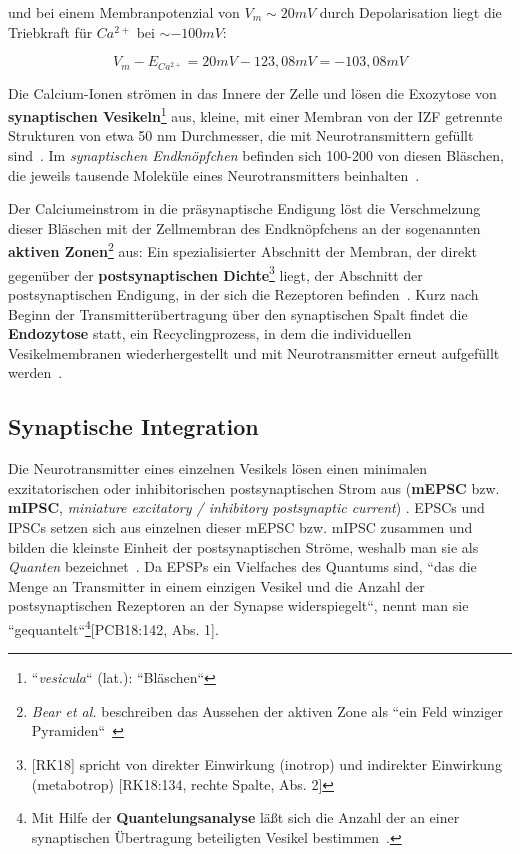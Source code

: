 {{{\pagebreak

und bei einem Membranpotenzial von $V_m \sim 20 mV$ durch Depolarisation liegt die Triebkraft für $Ca^{2+}$ bei $\sim -100 mV$:

\begin{equation}
 V_m - E_{Ca^{2+}} = 20 mV - 123,08 mV = -103,08 mV
 \label{eq:gl-triebkraftca2}
\end{equation}


Die Calcium-Ionen strömen in das Innere der Zelle und lösen die Exozytose von \textbf{synaptischen Vesikeln}\footnote{
 ``\textit{vesicula}`` (lat.): ``Bläschen``
} aus, kleine, mit einer Membran von der IZF getrennte Strukturen von etwa 50 nm Durchmesser, die mit Neurotransmittern gefüllt sind~\cite[1000]{BCP18}.
Im \textit{synaptischen Endknöpfchen} befinden sich 100-200 von diesen Bläschen, die jeweils tausende Moleküle eines Neurotransmitters beinhalten~\cite[184]{KSJ+13}.

Der Calciumeinstrom in die präsynaptische Endigung löst die Verschmelzung dieser Bläschen mit der Zellmembran des Endknöpfchens an der sogenannten \textbf{aktiven Zonen}\footnote{
 \textit{Bear et al.} beschreiben das Aussehen der aktiven Zone als ``ein Feld winziger Pyramiden``~\cite[123]{BCP18}
} aus: Ein spezialisierter Abschnitt der Membran, der direkt gegenüber der \textbf{postsynaptischen Dichte}\footnote{
 [RK18] spricht von direkter Einwirkung (inotrop) und indirekter Einwirkung (metabotrop) [RK18:134, rechte Spalte, Abs. 2]
} liegt, der Abschnitt der postsynaptischen Endigung, in der sich die Rezeptoren befinden~\cite[96]{HS19a}.
Kurz nach Beginn der Transmitterübertragung über den synaptischen Spalt findet die \textbf{Endozytose} statt, ein Recyclingprozess, in dem die individuellen Vesikelmembranen wiederhergestellt und mit Neurotransmitter erneut aufgefüllt werden~\cite[133]{BCP18}.


\subsection{Synaptische Integration}

Die Neurotransmitter eines einzelnen Vesikels lösen einen minimalen exzitatorischen oder inhibitorischen postsynaptischen Strom aus (\textbf{mEPSC} bzw. \textbf{mIPSC}, \textit{miniature excitatory / inhibitory postsynaptic current}) . 
EPSCs und IPSCs setzen sich aus einzelnen dieser mEPSC bzw. mIPSC zusammen und bilden die kleinste Einheit der postsynaptischen Ströme, weshalb man sie als \textit{Quanten} bezeichnet~\cite[98]{HS19a}.
Da EPSPs ein Vielfaches des Quantums sind, ``das die Menge an Transmitter in einem einzigen Vesikel und die Anzahl der postsynaptischen Rezeptoren an der Synapse widerspiegelt``, nennt man sie ``gequantelt``\footnote{
 Mit Hilfe der \textbf{Quantelungsanalyse} läßt sich die Anzahl der an einer synaptischen Übertragung beteiligten Vesikel bestimmen~\cite[142]{BCP18}.
}[PCB18:142, Abs. 1].

}}}
